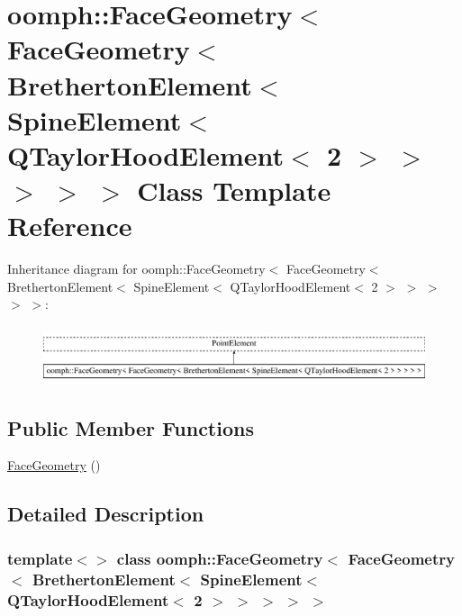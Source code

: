 \hypertarget{classoomph_1_1FaceGeometry_3_01FaceGeometry_3_01BrethertonElement_3_01SpineElement_3_01QTaylorHoa5ee68c3d3e62f3e07a972f1f9faface}{}\section{oomph\+:\+:Face\+Geometry$<$ Face\+Geometry$<$ Bretherton\+Element$<$ Spine\+Element$<$ Q\+Taylor\+Hood\+Element$<$ 2 $>$ $>$ $>$ $>$ $>$ Class Template Reference}
\label{classoomph_1_1FaceGeometry_3_01FaceGeometry_3_01BrethertonElement_3_01SpineElement_3_01QTaylorHoa5ee68c3d3e62f3e07a972f1f9faface}
Inheritance diagram for oomph\+:\+:Face\+Geometry$<$ Face\+Geometry$<$ Bretherton\+Element$<$ Spine\+Element$<$ Q\+Taylor\+Hood\+Element$<$ 2 $>$ $>$ $>$ $>$ $>$\+:\begin{figure}[H]
\begin{center}
\leavevmode
\includegraphics[height=1.709924cm]{classoomph_1_1FaceGeometry_3_01FaceGeometry_3_01BrethertonElement_3_01SpineElement_3_01QTaylorHoa5ee68c3d3e62f3e07a972f1f9faface}
\end{center}
\end{figure}
\subsection*{Public Member Functions}
\begin{DoxyCompactItemize}
\item 
\hyperlink{classoomph_1_1FaceGeometry_3_01FaceGeometry_3_01BrethertonElement_3_01SpineElement_3_01QTaylorHoa5ee68c3d3e62f3e07a972f1f9faface_a35e4c88e39164f318d20e3c7e4ddadc1}{Face\+Geometry} ()
\end{DoxyCompactItemize}


\subsection{Detailed Description}
\subsubsection*{template$<$$>$\newline
class oomph\+::\+Face\+Geometry$<$ Face\+Geometry$<$ Bretherton\+Element$<$ Spine\+Element$<$ Q\+Taylor\+Hood\+Element$<$ 2 $>$ $>$ $>$ $>$ $>$}

